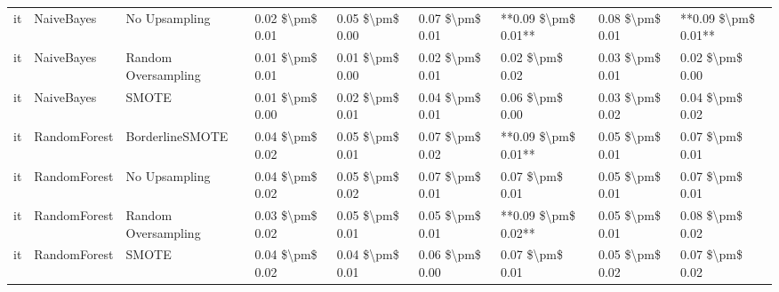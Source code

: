\begin{tabular}{lllllllll}
      it &                      NaiveBayes &                 No Upsampling & 0.02 \$\textbackslash pm\$ 0.01 &           0.05 \$\textbackslash pm\$ 0.00 &       0.07 \$\textbackslash pm\$ 0.01 &    **0.09 \$\textbackslash pm\$ 0.01** &                         0.08 \$\textbackslash pm\$ 0.01 & **0.09 \$\textbackslash pm\$ 0.01** \\
      it &                      NaiveBayes &           Random Oversampling & 0.01 \$\textbackslash pm\$ 0.01 &           0.01 \$\textbackslash pm\$ 0.00 &       0.02 \$\textbackslash pm\$ 0.01 &        0.02 \$\textbackslash pm\$ 0.02 &                         0.03 \$\textbackslash pm\$ 0.01 &     0.02 \$\textbackslash pm\$ 0.00 \\
      it &                      NaiveBayes &                         SMOTE & 0.01 \$\textbackslash pm\$ 0.00 &           0.02 \$\textbackslash pm\$ 0.01 &       0.04 \$\textbackslash pm\$ 0.01 &        0.06 \$\textbackslash pm\$ 0.00 &                         0.03 \$\textbackslash pm\$ 0.02 &     0.04 \$\textbackslash pm\$ 0.02 \\
      it &                    RandomForest &               BorderlineSMOTE & 0.04 \$\textbackslash pm\$ 0.02 &           0.05 \$\textbackslash pm\$ 0.01 &       0.07 \$\textbackslash pm\$ 0.02 &    **0.09 \$\textbackslash pm\$ 0.01** &                         0.05 \$\textbackslash pm\$ 0.01 &     0.07 \$\textbackslash pm\$ 0.01 \\
      it &                    RandomForest &                 No Upsampling & 0.04 \$\textbackslash pm\$ 0.02 &           0.05 \$\textbackslash pm\$ 0.02 &       0.07 \$\textbackslash pm\$ 0.01 &        0.07 \$\textbackslash pm\$ 0.01 &                         0.05 \$\textbackslash pm\$ 0.01 &     0.07 \$\textbackslash pm\$ 0.01 \\
      it &                    RandomForest &           Random Oversampling & 0.03 \$\textbackslash pm\$ 0.02 &           0.05 \$\textbackslash pm\$ 0.01 &       0.05 \$\textbackslash pm\$ 0.01 &    **0.09 \$\textbackslash pm\$ 0.02** &                         0.05 \$\textbackslash pm\$ 0.01 &     0.08 \$\textbackslash pm\$ 0.02 \\
      it &                    RandomForest &                         SMOTE & 0.04 \$\textbackslash pm\$ 0.02 &           0.04 \$\textbackslash pm\$ 0.01 &       0.06 \$\textbackslash pm\$ 0.00 &        0.07 \$\textbackslash pm\$ 0.01 &                         0.05 \$\textbackslash pm\$ 0.02 &     0.07 \$\textbackslash pm\$ 0.02 \\

\end{tabular}
